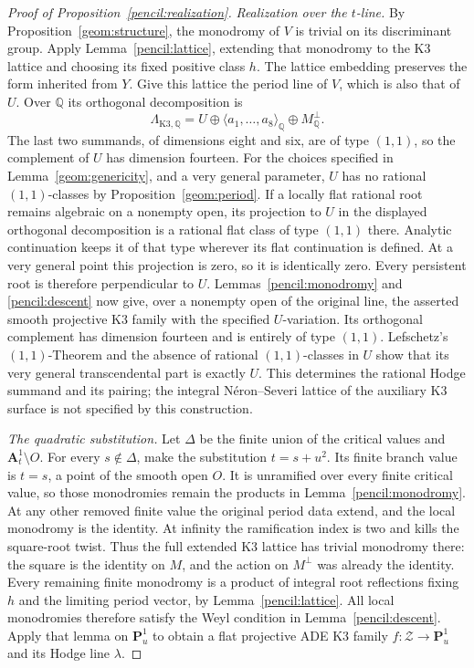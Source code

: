 \documentclass[11pt]{amsart}
\newcommand{\Q}{\mathbb Q}
\newcommand{\PP}{\mathbf P}
\renewcommand{\AA}{\mathbf A}
\theoremstyle{definition}
\theoremstyle{remark}
\numberwithin{equation}{section}
\begin{document}
\begin{proof}[Proof of Proposition~\ref{pencil:realization}]
\emph{Realization over the \(t\)-line.}
By Proposition~\ref{geom:structure}, the monodromy of \(V\) is trivial
on its discriminant group.  Apply Lemma~\ref{pencil:lattice}, extending
that monodromy to the K3 lattice and choosing its fixed positive class
\(h\).  The lattice embedding preserves the form inherited from \(Y\).
Give this lattice the period line of \(V\), which is also that of
\(U\).  Over \(\Q\) its orthogonal decomposition is
\[
 \Lambda_{\mathrm{K3},\Q}=U\oplus\langle a_1,\ldots,a_8\rangle_\Q
                       \oplus M_\Q^\perp.
\]
The last two summands, of dimensions eight and six, are of type
\((1,1)\), so the complement of \(U\) has dimension fourteen.  For the
choices specified in
Lemma~\ref{geom:genericity}, and a very general parameter, \(U\) has
no rational \((1,1)\)-classes by Proposition~\ref{geom:period}.
If a locally flat rational root remains algebraic on a nonempty
open, its projection to \(U\) in the displayed orthogonal decomposition
is a rational flat class of type \((1,1)\) there.  Analytic continuation
keeps it of that type wherever its flat continuation is defined.
At a very general point this projection is zero, so it is identically
zero.  Every persistent root is therefore perpendicular to \(U\).
Lemmas~\ref{pencil:monodromy} and
\ref{pencil:descent} now give, over a nonempty open of the original
line, the asserted smooth projective K3 family with the specified
\(U\)-variation.  Its orthogonal complement has dimension fourteen
and is entirely of type \((1,1)\).  Lefschetz's \((1,1)\)-Theorem
and the absence of rational \((1,1)\)-classes in \(U\) show that its
very general transcendental part is exactly \(U\).  This determines
the rational Hodge summand and its pairing; the integral
N\'eron--Severi lattice of the auxiliary K3 surface is not specified
by this construction.

\emph{The quadratic substitution.}
Let \(\Delta\) be the finite union of the critical values and
\(\AA^1_t\setminus O\).  For every \(s\notin\Delta\), make the
substitution \(t=s+u^2\).  Its finite branch value is \(t=s\), a
point of the smooth open \(O\).  It is unramified over every finite
critical value, so those monodromies remain the products in
Lemma~\ref{pencil:monodromy}.  At any other removed finite value the
original period data extend, and the local monodromy is the identity.
At infinity the ramification index is two and kills the square-root
twist.  Thus the full extended K3 lattice has trivial monodromy there:
the square is the identity on \(M\), and the action on \(M^\perp\)
was already the identity.  Every remaining finite monodromy is a
product of integral root reflections fixing \(h\) and the limiting
period vector, by Lemma~\ref{pencil:lattice}.  All local monodromies
therefore satisfy the Weyl condition in
Lemma~\ref{pencil:descent}.  Apply that lemma on \(\PP^1_u\) to
obtain a flat projective ADE K3 family
\(f:\mathcal Z\to\PP^1_u\) and its Hodge line \(\lambda\).


\end{proof}
\end{document}
